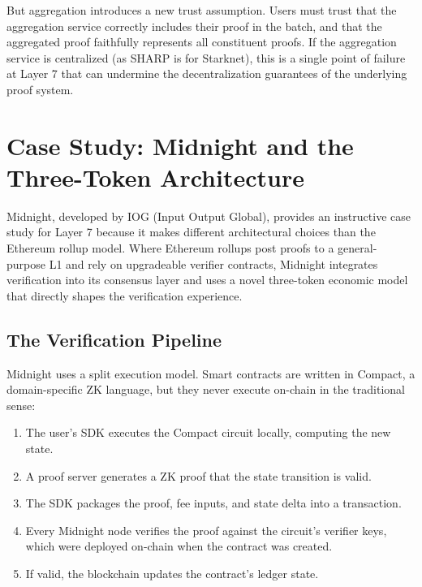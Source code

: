 \documentclass[
  11pt,
  openany]{report}
\providecommand{\tightlist}{%
  \setlength{\itemsep}{0pt}\setlength{\parskip}{0pt}}
\begin{document}
But aggregation introduces a new trust assumption. Users must trust that the
aggregation service correctly includes their proof in the batch, and that the
aggregated proof faithfully represents all constituent proofs. If the
aggregation service is centralized (as SHARP is for Starknet), this is a single
point of failure at Layer 7 that can undermine the decentralization guarantees
of the underlying proof system.

\section{Case Study: Midnight and the Three-Token
Architecture}\label{case-study-midnight-and-the-three-token-architecture}

Midnight, developed by IOG (Input Output Global), provides an instructive case
study for Layer 7 because it makes different architectural choices than the
Ethereum rollup model. Where Ethereum rollups post proofs to a general-purpose
L1 and rely on upgradeable verifier contracts, Midnight integrates verification
into its consensus layer and uses a novel three-token economic model that
directly shapes the verification experience.

\subsection{The Verification Pipeline}\label{the-verification-pipeline}

Midnight uses a split execution model. Smart contracts are written in Compact, a
domain-specific ZK language, but they never execute on-chain in the traditional
sense:

\begin{enumerate}
\def\labelenumi{\arabic{enumi}.}
\tightlist
\item
  The user's SDK executes the Compact circuit locally, computing the new state.
\item
  A proof server generates a ZK proof that the state transition is valid.
\item
  The SDK packages the proof, fee inputs, and state delta into a transaction.
\item
  Every Midnight node verifies the proof against the circuit's verifier keys,
  which were deployed on-chain when the contract was created.
\item
  If valid, the blockchain updates the contract's ledger state.
\end{enumerate}
\end{document}
